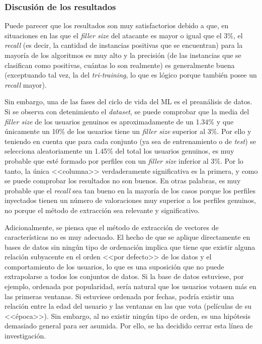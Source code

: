 \subsubsection{Discusión de los resultados}

Puede parecer que los resultados son muy satisfactorios debido a que, en situaciones en las que el \textit{filler size} del atacante es mayor o igual que el $3\%$, el \textit{recall} (es decir, la cantidad de instancias positivas que se encuentran) para la mayoría de los algoritmos es muy alto y la precisión (de las instancias que se clasifican como positivas, cuántas lo son realmente) es generalmente buena (exceptuando tal vez, la del \textit{tri-training}, lo que es lógico porque también posee un \textit{recall} mayor).

Sin embargo, una de las fases del ciclo de vida del ML es el preanálisis de datos. Si se observa con detenimiento el \textit{dataset}, se puede comprobar que la media del \textit{filler size} de los usuarios genuinos es aproximadamente de un 1.34$\%$ y que únicamente un 10$\%$ de los usuarios tiene un \textit{filler size} superior al 3$\%$. Por ello y teniendo en cuenta que para cada conjunto (ya sea de entrenamiento o de \textit{test}) se selecciona aleatoriamente un 1.45\% del total los usuarios genuinos, es muy probable que esté formado por perfiles con un \textit{filler size} inferior al 3$\%$. Por lo tanto, la única <<columna>> verdaderamente significativa es la primera, y como se puede comprobar los resultados no son buenos. En otras palabras, es muy probable que el \textit{recall} sea tan bueno en la mayoría de los casos porque los perfiles inyectados tienen un número de valoraciones muy superior a los perfiles genuinos, no porque el método de extracción sea relevante y significativo.

Adicionalmente, se piensa que el método de extracción de vectores de características no es muy adecuado. El hecho de que se aplique directamente en bases de datos sin ningún tipo de ordenación implica que tiene que existir alguna relación subyacente en el orden <<por defecto>> de los datos y el comportamiento de los usuarios, lo que es una suposición que no puede extrapolarse a todos los conjuntos de datos. Si la base de datos estuviese, por ejemplo, ordenada por popularidad, sería natural que los usuarios votasen más en las primeras ventanas. Si estuviese ordenada por fechas, podría existir una relación entre la edad del usuario y las ventanas en las que vota (películas de su <<época>>). Sin embargo, al no existir ningún tipo de orden, es una hipótesis demasiado general para ser asumida. Por ello, se ha decidido cerrar esta línea de investigación.


